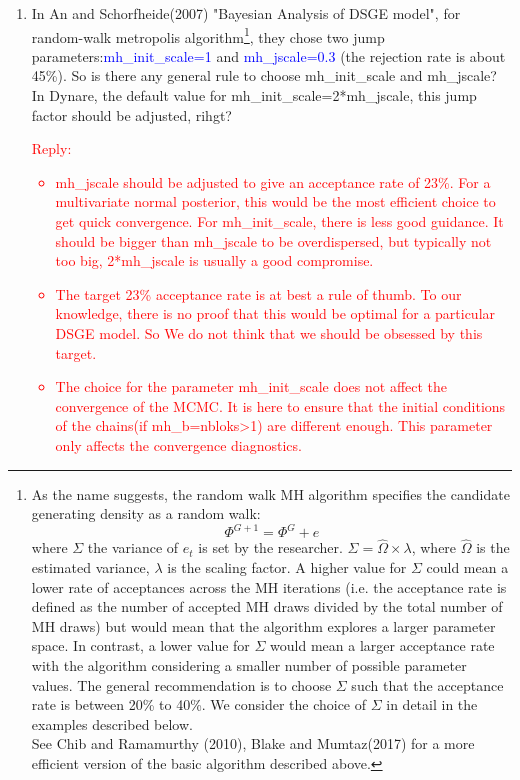 \documentclass[10pt,math=newtx,citestyle=gb7714-2015,bibstyle=gb7714-2015]{elegantbook}
\begin{document}
{{{\begin{enumerate}
		\item In An and Schorfheide(2007) "Bayesian Analysis of DSGE model", for random-walk metropolis algorithm\footnote{As the name suggests, the random walk MH algorithm specifies the candidate generating density as a random walk:
			$$\Phi^{G+1}=\Phi^G+e$$
			where $\Sigma$ the variance of $e_t$ is set by the researcher. $\Sigma=\hat{\Omega}\times \lambda$, where $\hat{\Omega}$ is the estimated variance, $\lambda$ is the scaling factor. A higher value for $\Sigma$ could mean a lower rate of acceptances across the MH iterations (i.e. the acceptance rate is defined as the number of accepted MH draws divided by the total number of MH draws) but would mean that the algorithm explores a larger parameter space. In contrast, a lower value for $\Sigma$ would mean a larger acceptance rate with the algorithm considering a smaller number of possible parameter values. The general recommendation is to choose $\Sigma$ such that the acceptance rate is between 20\% to 40\%. We consider the choice of $\Sigma$ in detail in the examples described below.\\
			See Chib and Ramamurthy (2010), Blake and Mumtaz(2017) for a more efficient version of the basic algorithm described above.}, they chose two jump parameters:\textcolor{blue}{mh\_init\_scale=1} and \textcolor{blue}{mh\_jscale=0.3} (the rejection rate is about 45\%). So is there any general rule to choose mh\_init\_scale and mh\_jscale? In Dynare, the default value for mh\_init\_scale=2*mh\_jscale, this jump factor should be adjusted, rihgt?\\
		\textcolor{red}{Reply:
			\begin{itemize}
				\item mh\_jscale should be adjusted to give an acceptance rate of 23\%. For a multivariate normal posterior, this would be the most efficient choice to get quick convergence. For mh\_init\_scale, there is less good guidance. It should be bigger than mh\_jscale to be overdispersed, but typically not too big, 2*mh\_jscale is usually a good compromise.
				\item The target 23\% acceptance rate is at best a rule of thumb. To our knowledge, there is no proof that this would be optimal for a particular DSGE model. So We do not think that we should be obsessed by this target.
				\item The choice for the parameter mh\_init\_scale does not affect the convergence of the MCMC. It is here to ensure that the initial conditions of the chains(if mh\_b=nbloks>1) are different enough. This parameter only affects the convergence diagnostics.

\end{itemize}}
\end{enumerate}}}}
\end{document}
